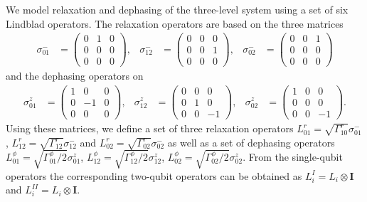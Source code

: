 We model relaxation and dephasing of the three-level system using a set of six Lindblad operators. The relaxation operators are based on the three matrices
%
\begin{align}
\sigma^-_{01} & =  \left( \begin{array}{ccc} 0 & 1 & 0 \\ 0 & 0 & 0 \\ 0 & 0 & 0 \end{array} \right), & 
\sigma^-_{12} & =  \left( \begin{array}{ccc} 0 & 0 & 0 \\ 0 & 0 & 1 \\ 0 & 0 & 0 \end{array} \right), &
\sigma^-_{02} & =  \left( \begin{array}{ccc} 0 & 0 & 1 \\ 0 & 0 & 0 \\ 0 & 0 & 0 \end{array} \right)
\end{align}
%
and the dephasing operators on
%
\begin{align}
\sigma^z_{01} & =  \left( \begin{array}{ccc} 1 & 0 & 0 \\ 0 &-1 & 0 \\ 0 & 0 & 0 \end{array} \right), &
\sigma^z_{12} & =  \left( \begin{array}{ccc} 0 & 0 & 0 \\ 0 & 1 & 0 \\ 0 & 0 &-1 \end{array} \right), &
\sigma^z_{02} & =  \left( \begin{array}{ccc} 1 & 0 & 0 \\ 0 & 0 & 0 \\ 0 & 0 &-1 \end{array} \right).  
\end{align}
%
Using these matrices, we define a set of three relaxation operators $L^r_{01} = \sqrt{\Gamma^r_{10}}\sigma^-_{01}$, $L^r_{12} = \sqrt{\Gamma^r_{12}}\sigma^-_{12}$ and $L^r_{02}=\sqrt{\Gamma^r_{02}}\sigma^-_{02}$ as well as a set of dephasing operators $L^\phi_{01} = \sqrt{\Gamma^\phi_{01}/2}\sigma^z_{01}$, $L^\phi_{12} = \sqrt{\Gamma^\phi_{12}/2}\sigma^z_{12}$, $L^\phi_{02}=\sqrt{\Gamma^\phi_{02}/2}\sigma^z_{02}$. From the single-qubit operators the corresponding two-qubit operators can be obtained as $L^I_i = L_i\otimes {\mathbf I}$ and $L^{II}_i = L_i\otimes {\mathbf I}$.

